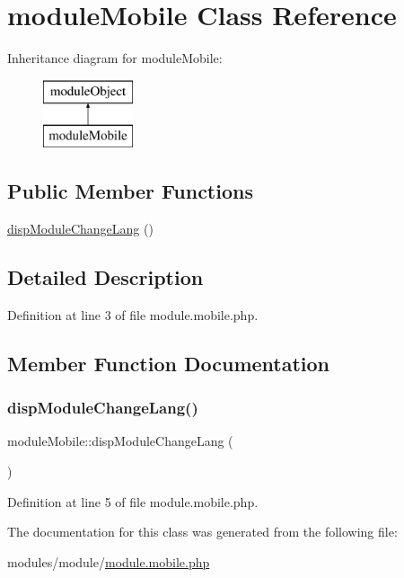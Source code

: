 \hypertarget{classmoduleMobile}{}\section{module\+Mobile Class Reference}
\label{classmoduleMobile}
Inheritance diagram for module\+Mobile\+:\begin{figure}[H]
\begin{center}
\leavevmode
\includegraphics[height=2.000000cm]{classmoduleMobile}
\end{center}
\end{figure}
\subsection*{Public Member Functions}
\begin{DoxyCompactItemize}
\item 
\hyperlink{classmoduleMobile_a363c055c38141411547ef1d87b6e7592}{disp\+Module\+Change\+Lang} ()
\end{DoxyCompactItemize}


\subsection{Detailed Description}


Definition at line 3 of file module.\+mobile.\+php.



\subsection{Member Function Documentation}
\hypertarget{classmoduleMobile_a363c055c38141411547ef1d87b6e7592}{}\label{classmoduleMobile_a363c055c38141411547ef1d87b6e7592} 
\subsubsection{\texorpdfstring{disp\+Module\+Change\+Lang()}{dispModuleChangeLang()}}
{\footnotesize\ttfamily module\+Mobile\+::disp\+Module\+Change\+Lang (\begin{DoxyParamCaption}{ }\end{DoxyParamCaption})}



Definition at line 5 of file module.\+mobile.\+php.



The documentation for this class was generated from the following file\+:\begin{DoxyCompactItemize}
\item 
modules/module/\hyperlink{module_8mobile_8php}{module.\+mobile.\+php}\end{DoxyCompactItemize}
